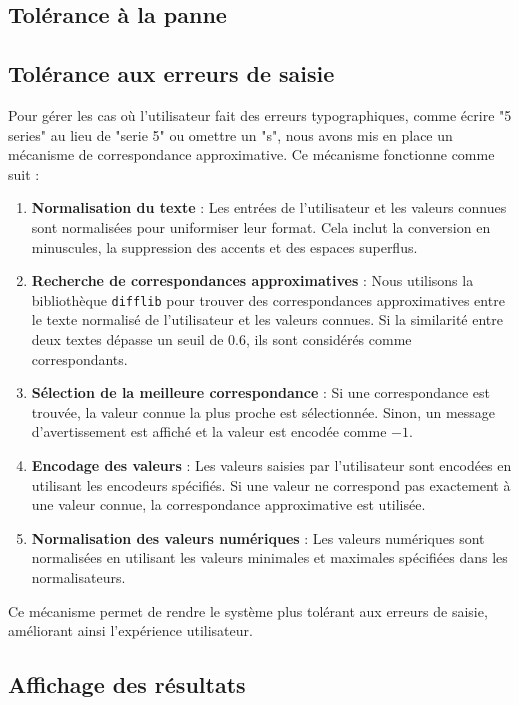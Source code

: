 \documentclass[12pt]{report}
\begin{document}
\subsection{Tolérance à la panne}

\subsection{Tolérance aux erreurs de saisie}

Pour gérer les cas où l'utilisateur fait des erreurs typographiques, comme écrire "5 series" au lieu de "serie 5" ou omettre un "s", nous avons mis en place un mécanisme de correspondance approximative. Ce mécanisme fonctionne comme suit :

\begin{enumerate}
    \item \textbf{Normalisation du texte} : Les entrées de l'utilisateur et les valeurs connues sont normalisées pour uniformiser leur format. Cela inclut la conversion en minuscules, la suppression des accents et des espaces superflus.
    \item \textbf{Recherche de correspondances approximatives} : Nous utilisons la bibliothèque \texttt{difflib} pour trouver des correspondances approximatives entre le texte normalisé de l'utilisateur et les valeurs connues. Si la similarité entre deux textes dépasse un seuil de 0.6, ils sont considérés comme correspondants.
    \item \textbf{Sélection de la meilleure correspondance} : Si une correspondance est trouvée, la valeur connue la plus proche est sélectionnée. Sinon, un message d'avertissement est affiché et la valeur est encodée comme \(-1\).
    \item \textbf{Encodage des valeurs} : Les valeurs saisies par l'utilisateur sont encodées en utilisant les encodeurs spécifiés. Si une valeur ne correspond pas exactement à une valeur connue, la correspondance approximative est utilisée.
    \item \textbf{Normalisation des valeurs numériques} : Les valeurs numériques sont normalisées en utilisant les valeurs minimales et maximales spécifiées dans les normalisateurs.
\end{enumerate}

Ce mécanisme permet de rendre le système plus tolérant aux erreurs de saisie, améliorant ainsi l'expérience utilisateur.

\subsection{Affichage des résultats}
\end{document}
